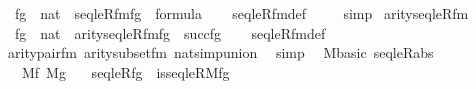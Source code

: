 \begin{isabellebody}
\ \ {\isachardoublequoteopen}fg\ {\isasymin}\ nat\ {\isasymLongrightarrow}\ seqleR{\isacharunderscore}{\kern0pt}fm{\isacharparenleft}{\kern0pt}fg{\isacharparenright}{\kern0pt}\ {\isasymin}\ formula{\isachardoublequoteclose}\isanewline
%
\isadelimproof
\ \ %
\endisadelimproof
%
\isatagproof
{}\isamarkupfalse%
\ seqleR{\isacharunderscore}{\kern0pt}fm{\isacharunderscore}{\kern0pt}def\ \isanewline
\ \ \isamarkupfalse%
\ simp%
\endisatagproof
{\isafoldproof}%
%
\isadelimproof
\isanewline
%
\endisadelimproof
\isanewline
{}\isamarkupfalse%
\ arity{\isacharunderscore}{\kern0pt}seqleR{\isacharunderscore}{\kern0pt}fm\ {\isacharcolon}{\kern0pt}\isanewline
\ \ {\isachardoublequoteopen}fg\ {\isasymin}\ nat\ {\isasymLongrightarrow}\ arity{\isacharparenleft}{\kern0pt}seqleR{\isacharunderscore}{\kern0pt}fm{\isacharparenleft}{\kern0pt}fg{\isacharparenright}{\kern0pt}{\isacharparenright}{\kern0pt}\ {\isacharequal}{\kern0pt}\ succ{\isacharparenleft}{\kern0pt}fg{\isacharparenright}{\kern0pt}{\isachardoublequoteclose}\isanewline
%
\isadelimproof
\ \ %
\endisadelimproof
%
\isatagproof
{}\isamarkupfalse%
\ seqleR{\isacharunderscore}{\kern0pt}fm{\isacharunderscore}{\kern0pt}def\ \isanewline
\ \ \isamarkupfalse%
\ arity{\isacharunderscore}{\kern0pt}pair{\isacharunderscore}{\kern0pt}fm\ arity{\isacharunderscore}{\kern0pt}subset{\isacharunderscore}{\kern0pt}fm\ nat{\isacharunderscore}{\kern0pt}simp{\isacharunderscore}{\kern0pt}union\ \isamarkupfalse%
\ simp%
\endisatagproof
{\isafoldproof}%
%
\isadelimproof
\isanewline
%
\endisadelimproof
\isanewline
{}\isamarkupfalse%
\ {\isacharparenleft}{\kern0pt}\ M{\isacharunderscore}{\kern0pt}basic{\isacharparenright}{\kern0pt}\ seqleR{\isacharunderscore}{\kern0pt}abs{\isacharcolon}{\kern0pt}\ \isanewline
\ \ \ {\isachardoublequoteopen}M{\isacharparenleft}{\kern0pt}f{\isacharparenright}{\kern0pt}{\isachardoublequoteclose}\ {\isachardoublequoteopen}M{\isacharparenleft}{\kern0pt}g{\isacharparenright}{\kern0pt}{\isachardoublequoteclose}\isanewline
\ \ \ {\isachardoublequoteopen}seqleR{\isacharparenleft}{\kern0pt}f{\isacharcomma}{\kern0pt}g{\isacharparenright}{\kern0pt}\ {\isasymlongleftrightarrow}\ is{\isacharunderscore}{\kern0pt}seqleR{\isacharparenleft}{\kern0pt}M{\isacharcomma}{\kern0pt}f{\isacharcomma}{\kern0pt}g{\isacharparenright}{\kern0pt}{\isachardoublequoteclose}\isanewline
%
\isadelimproof
\ \ %
\endisadelimproof
%
\isatagproof
{}\isamarkupfalse%

\end{isabellebody}
